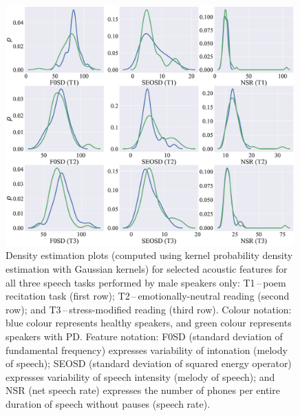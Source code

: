 \begin{figure}[htb!]
	\centering
	\scriptsize
	\includegraphics[width=0.99\textwidth]{pictures/ch4_comparisons_males.eps}
	\caption[Density estimation plots for male speakers.]{Density estimation plots (computed using kernel probability density estimation with Gaussian kernels) for selected acoustic features for all three speech tasks performed by male speakers only: T1\,--\,poem recitation task (first row); T2\,--\,emotionally-neutral reading (second row); and T3\,--\,stress-modified reading (third row). Colour notation: blue colour represents healthy speakers, and green colour represents speakers with PD. Feature notation: F0SD (standard deviation of fundamental frequency) expresses variability of intonation (melody of speech); SEOSD (standard deviation of squared energy operator) expresses variability of speech intensity (melody of speech); and NSR (net speech rate) expresses the number of phones per entire duration of speech without pauses (speech rate).}
	\label{fig:ch4_comparisons_males}
\end{figure}

